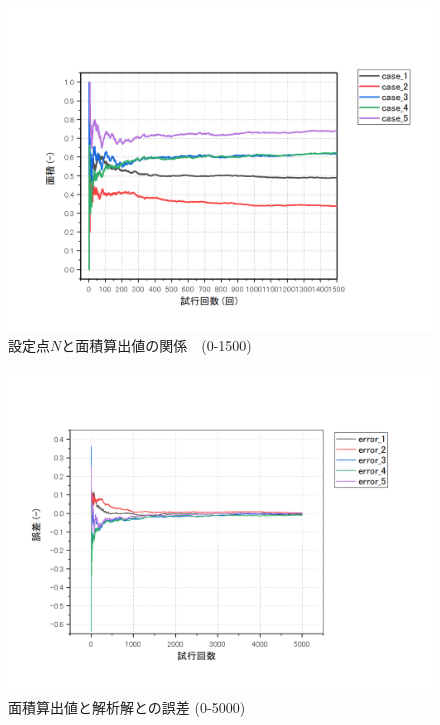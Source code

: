 \documentclass[12pt,a4paper]{jsarticle}
\begin{document}
\begin{figure}[htbp]
    \begin{center}
        \includegraphics[width=150mm]{Graph/result_0-1500.png}
        \caption{設定点$N$と面積算出値の関係　(0-1500)}
    \end{center}
\end{figure}
\begin{figure}[htbp]
    \begin{center}
        \includegraphics[width=150mm]{Graph/error_0-5000.png}
        \caption{面積算出値と解析解との誤差 (0-5000)}
    \end{center}
\end{figure}
\end{document}
